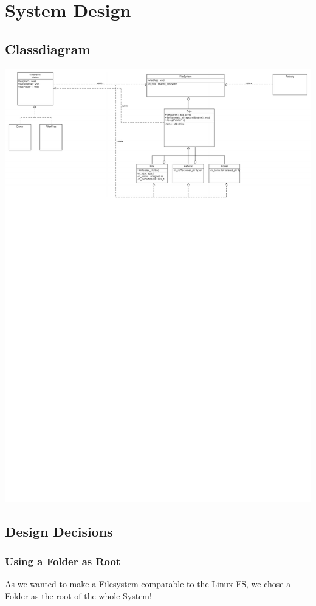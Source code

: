 \section{System Design}
\newpage
\subsection{Classdiagram}
\includegraphics[scale=1, angle=90]{../ClassDiagram.pdf}

\subsection{Design Decisions}
\subsubsection{Using a Folder as Root}
As we wanted to make a Filesystem comparable to the Linux-FS, we chose a Folder as the root of the whole System! 

